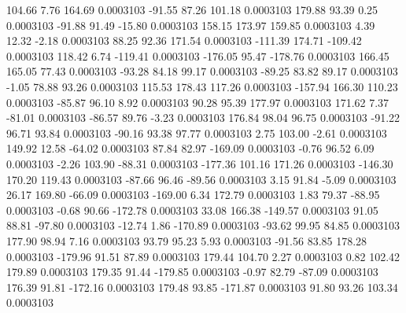       104.66        7.76      164.69     0.0003103
      -91.55       87.26      101.18     0.0003103
      179.88       93.39        0.25     0.0003103
      -91.88       91.49      -15.80     0.0003103
      158.15      173.97      159.85     0.0003103
        4.39       12.32       -2.18     0.0003103
       88.25       92.36      171.54     0.0003103
     -111.39      174.71     -109.42     0.0003103
      118.42        6.74     -119.41     0.0003103
     -176.05       95.47     -178.76     0.0003103
      166.45      165.05       77.43     0.0003103
      -93.28       84.18       99.17     0.0003103
      -89.25       83.82       89.17     0.0003103
       -1.05       78.88       93.26     0.0003103
      115.53      178.43      117.26     0.0003103
     -157.94      166.30      110.23     0.0003103
      -85.87       96.10        8.92     0.0003103
       90.28       95.39      177.97     0.0003103
      171.62        7.37      -81.01     0.0003103
      -86.57       89.76       -3.23     0.0003103
      176.84       98.04       96.75     0.0003103
      -91.22       96.71       93.84     0.0003103
      -90.16       93.38       97.77     0.0003103
        2.75      103.00       -2.61     0.0003103
      149.92       12.58      -64.02     0.0003103
       87.84       82.97     -169.09     0.0003103
       -0.76       96.52        6.09     0.0003103
       -2.26      103.90      -88.31     0.0003103
     -177.36      101.16      171.26     0.0003103
     -146.30      170.20      119.43     0.0003103
      -87.66       96.46      -89.56     0.0003103
        3.15       91.84       -5.09     0.0003103
       26.17      169.80      -66.09     0.0003103
     -169.00        6.34      172.79     0.0003103
        1.83       79.37      -88.95     0.0003103
       -0.68       90.66     -172.78     0.0003103
       33.08      166.38     -149.57     0.0003103
       91.05       88.81      -97.80     0.0003103
      -12.74        1.86     -170.89     0.0003103
      -93.62       99.95       84.85     0.0003103
      177.90       98.94        7.16     0.0003103
       93.79       95.23        5.93     0.0003103
      -91.56       83.85      178.28     0.0003103
     -179.96       91.51       87.89     0.0003103
      179.44      104.70        2.27     0.0003103
        0.82      102.42      179.89     0.0003103
      179.35       91.44     -179.85     0.0003103
       -0.97       82.79      -87.09     0.0003103
      176.39       91.81     -172.16     0.0003103
      179.48       93.85     -171.87     0.0003103
       91.80       93.26      103.34     0.0003103
